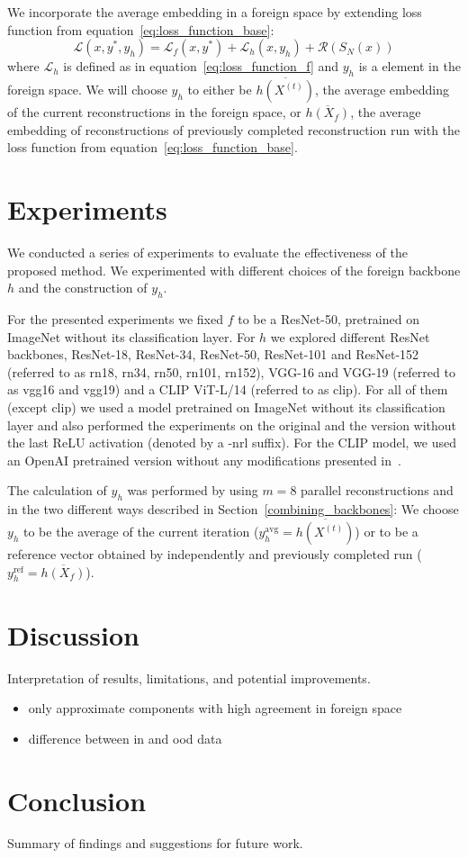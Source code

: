 \documentclass[10pt,twocolumn]{article}
\begin{document}
We incorporate the average embedding in a foreign space by extending loss function from equation~\ref{eq:loss_function_base}:
\begin{equation}\label{eq:loss_function}
\mathcal{L}(x, y^*, y_h) = \mathcal{L}_{f}(x, y^*) + \mathcal{L}_{h}(x, y_h) + \mathcal{R}(S_N(x))
\end{equation}
where $\mathcal{L}_{h}$ is defined as in equation~\ref{eq:loss_function_f} and $y_h$ is a element in the foreign space.
We will choose $y_h$ to either be $\overline{h(X^{(t)})}$, the average embedding of the current reconstructions in the foreign space, or $\overline{h(X_f)}$, the average embedding of reconstructions of previously completed reconstruction run with the loss function from equation~\ref{eq:loss_function_base}.

\section{Experiments}
We conducted a series of experiments to evaluate the effectiveness of the proposed method.
We experimented with different choices of the foreign backbone $h$ and the construction of $y_h$.

For the presented experiments we fixed $f$ to be a ResNet-50, pretrained on ImageNet without its classification layer.
For $h$ we explored different ResNet backbones, ResNet-18, ResNet-34, ResNet-50, ResNet-101 and ResNet-152 (referred to as rn18, rn34, rn50, rn101, rn152), VGG-16 and VGG-19 (referred to as vgg16 and vgg19) and a CLIP ViT-L/14 (referred to as clip).
For all of them (except clip) we used a model pretrained on ImageNet without its classification layer and also performed the experiments on the original and the version without the last ReLU activation (denoted by a -nrl suffix).
For the CLIP model, we used an OpenAI pretrained version without any modifications presented in~\cite{radfordLearningTransferableVisual2021}.

The calculation of $y_h$ was performed by using $m=8$ parallel reconstructions and in the two different ways described in Section~\ref{combining_backbones}:
We choose $y_h$ to be the average of the current iteration ($y_h^\text{avg}=\overline{h(X^{(t)})}$) or to be a reference vector obtained by independently and previously completed run ($y_h^\text{ref}=\overline{h(X_f)}$).

\section{Discussion}
Interpretation of results, limitations, and potential improvements.
\begin{itemize}
    \item only approximate components with high agreement in foreign space
    \item difference between in and ood data
\end{itemize}

\section{Conclusion}
Summary of findings and suggestions for future work.



\end{document}
